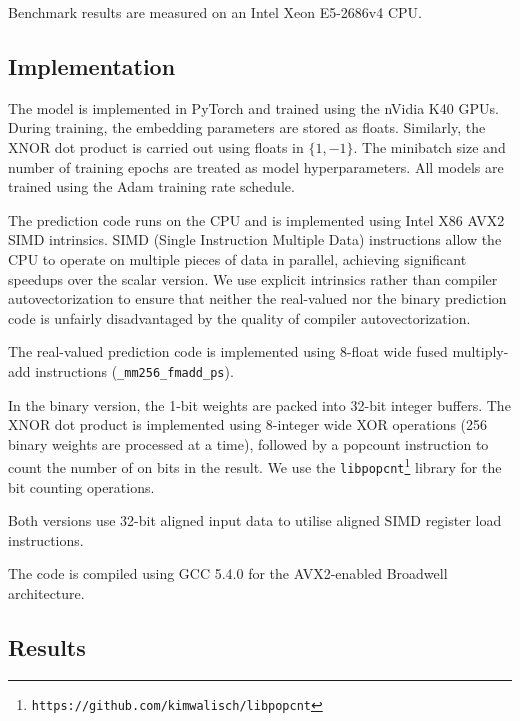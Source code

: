 \documentclass[sigconf]{acmart}
\begin{document}
Benchmark results are measured on an Intel Xeon E5-2686v4 CPU.

\subsection{Implementation}
The model is implemented in PyTorch and trained using the nVidia K40 GPUs. During training, the embedding parameters are stored as floats. Similarly, the XNOR dot product is carried out using floats in $\{1, -1\}$. The minibatch size and number of training epochs are treated as model hyperparameters. All models are trained using the Adam training rate schedule. 

The prediction code runs on the CPU and is implemented using Intel X86 AVX2 SIMD intrinsics. SIMD (Single Instruction Multiple Data) instructions allow the CPU to operate on multiple pieces of data in parallel, achieving significant speedups over the scalar version. We use explicit intrinsics rather than compiler autovectorization to ensure that neither the real-valued nor the binary prediction code is unfairly disadvantaged by the quality of compiler autovectorization. 

The real-valued prediction code is implemented using 8-float wide fused multiply-add instructions (\texttt{\_mm256\_fmadd\_ps}).

In the binary version, the 1-bit weights are packed into 32-bit integer buffers. The XNOR dot product is implemented using 8-integer wide XOR operations (256 binary weights are processed at a time), followed by a popcount instruction to count the number of on bits in the result. We use the \texttt{libpopcnt}\footnote{\texttt{https://github.com/kimwalisch/libpopcnt}} \citep{mula2016faster} library for the bit counting operations.

Both versions use 32-bit aligned input data to utilise aligned SIMD register load instructions. 

The code is compiled using GCC 5.4.0 for the AVX2-enabled Broadwell architecture.

\subsection{Results}







\end{document}

